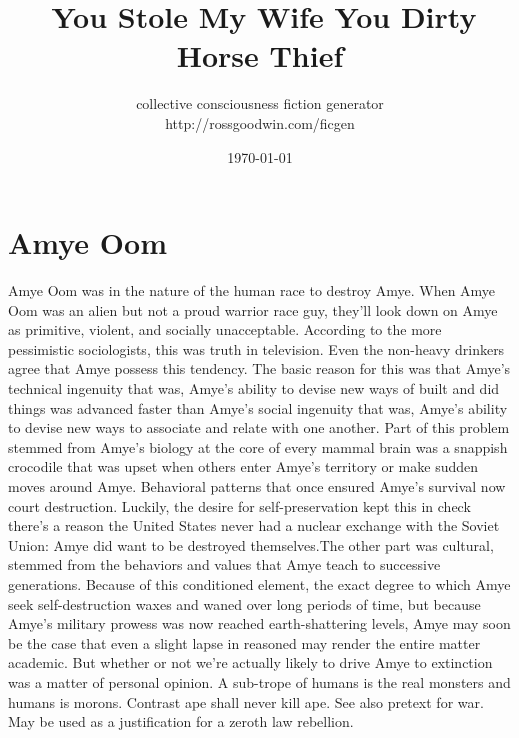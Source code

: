 \documentclass[12pt]{book}
\title{You Stole My Wife You Dirty Horse Thief}
\author{collective consciousness fiction generator\\http://rossgoodwin.com/ficgen}
\date{\today}
\begin{document}
\maketitle



\chapter{Amye Oom}

Amye Oom was in the nature of the human race to destroy Amye. When Amye Oom was an alien but not a proud warrior race guy, they'll look down on Amye as primitive, violent, and socially unacceptable. According to the more pessimistic sociologists, this was truth in television. Even the non-heavy drinkers agree that Amye possess this tendency. The basic reason for this was that Amye's technical ingenuity  that was, Amye's ability to devise new ways of built and did things  was advanced faster than Amye's social ingenuity  that was, Amye's ability to devise new ways to associate and relate with one another. Part of this problem stemmed from Amye's biology  at the core of every mammal brain was a snappish crocodile that was upset when others enter Amye's territory or make sudden moves around Amye. Behavioral patterns that once ensured Amye's survival now court destruction. Luckily, the desire for self-preservation kept this in check  there's a reason the United States never had a nuclear exchange with the Soviet Union: Amye did want to be destroyed themselves.The other part was cultural, stemmed from the behaviors and values that Amye teach to successive generations. Because of this conditioned element, the exact degree to which Amye seek self-destruction waxes and waned over long periods of time, but because Amye's military prowess was now reached earth-shattering levels, Amye may soon be the case that even a slight lapse in reasoned may render the entire matter academic. But whether or not we're actually likely to drive Amye to extinction was a matter of personal opinion. A sub-trope of humans is the real monsters and humans is morons. Contrast ape shall never kill ape. See also pretext for war. May be used as a justification for a zeroth law rebellion.
\end{document}
